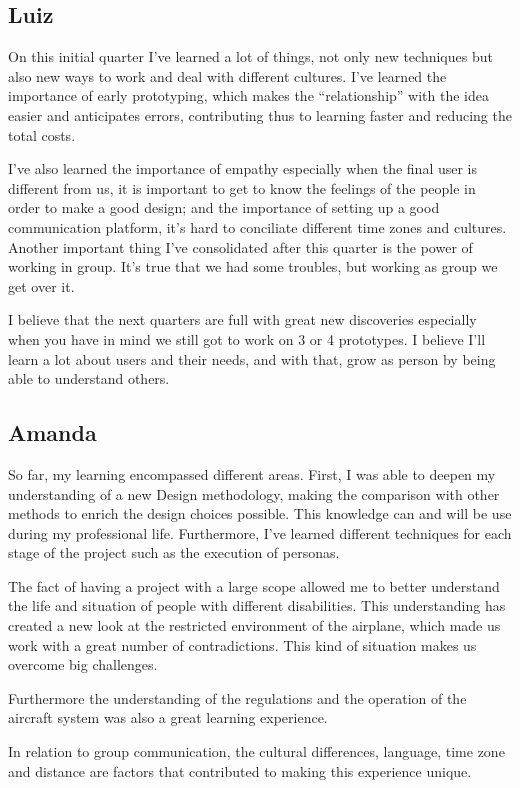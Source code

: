 \documentclass[a4paper, 12pt,conference]{new_cit_thesis}
\begin{document}
\subsection{Luiz}
On this initial quarter I’ve learned a lot of things, not only new techniques but also new ways to work and deal with different cultures. I’ve learned the importance of early prototyping, which makes the “relationship” with the idea easier and anticipates errors, contributing thus to learning faster and reducing the total costs.

I’ve also learned the importance of empathy especially when the final user is different from us, it is important to get to know the feelings of the people in order to make a good design; and the importance of setting up a good communication platform, it’s hard to conciliate different time zones and cultures. Another important thing I’ve consolidated after this quarter is the power of working in group. It’s true that we had some troubles, but working as group we get over it.

I believe that the next quarters are full with great new discoveries especially when you have in mind we still got to work on 3 or 4 prototypes. I believe I’ll learn a lot about users and their needs, and with that, grow as person by being able to understand others.

\subsection{Amanda}
So far, my learning encompassed different areas. First, I was able to deepen my understanding of a new Design methodology, making the comparison with other methods to enrich the design choices possible. This knowledge can and will be use during my professional life. Furthermore, I’ve learned different techniques for each stage of the project such as the execution of personas.

The fact of having a project with a large scope allowed me to better understand the life and situation of people with different disabilities. This understanding has created a new look at the restricted environment of the airplane, which made us work with a great number of contradictions. This kind of situation makes us overcome big challenges.

Furthermore the understanding of the regulations and the operation of the aircraft system was also a great learning experience.

In relation to group communication, the cultural differences, language, time zone and distance are factors that contributed to making this experience unique.    
\end{document}
